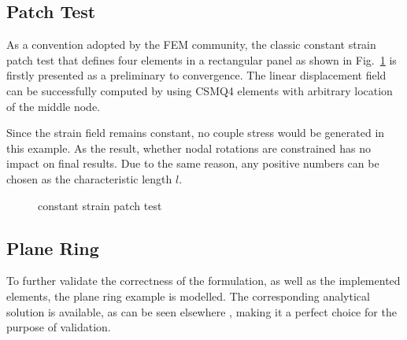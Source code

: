 \documentclass[3p,sort&compress,11pt,fleqn,review]{elsarticle}
\newcommand*{\figref}[1]{Fig.~\ref{#1}}
\begin{document}
\subsection{Patch Test}
As a convention adopted by the FEM community, the classic constant strain patch test that defines four elements in a rectangular panel as shown in \figref{fig:csmq_patch} is firstly presented as a preliminary to convergence. The linear displacement field can be successfully computed by using CSMQ4 elements with arbitrary location of the middle node.

Since the strain field remains constant, no couple stress would be generated in this example. As the result, whether nodal rotations are constrained has no impact on final results. Due to the same reason, any positive numbers can be chosen as the characteristic length $l$.
\begin{figure}[htb]
\centering\scriptsize
{}
\caption{constant strain patch test}\label{fig:csmq_patch}
\end{figure}
\subsection{Plane Ring}
To further validate the correctness of the formulation, as well as the implemented elements, the plane ring example is modelled. The corresponding analytical solution is available, as can be seen elsewhere \citep{Hadjesfandiari2011}, making it a perfect choice for the purpose of validation.
\end{document}
